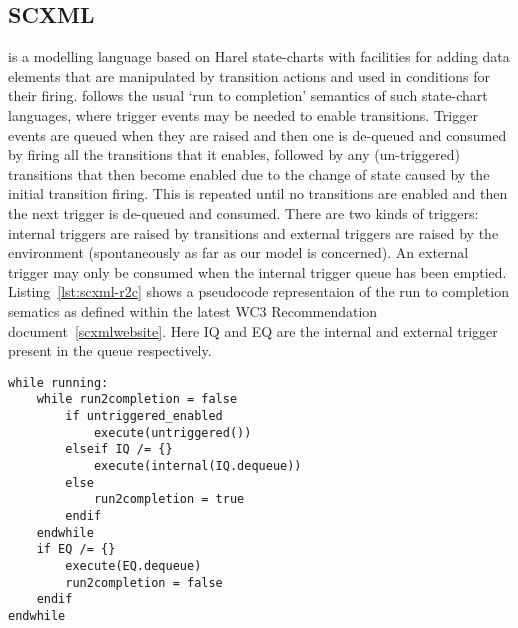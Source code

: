 

\subsection{SCXML}
\label{sec:scxml}

\SCXML is a modelling language based on Harel state-charts with facilities for adding data elements that are manipulated by transition actions and used in conditions for their firing. \SCXML follows the usual `run to completion' semantics of such state-chart languages, where trigger events may be needed to enable transitions. Trigger events are queued when they are raised and then one is de-queued and consumed by firing all the transitions that it enables, followed by any (un-triggered) transitions that then become enabled due to the change of state caused by the initial transition firing. This is repeated until no transitions are enabled and then the next trigger is de-queued and consumed. There are two kinds of triggers: internal triggers are raised by transitions and external triggers are raised by the environment (spontaneously as far as our model is concerned). An external trigger may only be consumed when the internal trigger queue has been emptied. Listing~\ref{lst:scxml-r2c} shows a pseudocode representaion of the run to completion sematics as defined within the latest WC3 Recommendation document~\ref{scxmlwebsite}. Here IQ and EQ are the internal and external trigger present in the queue respectively. 

\begin{lstlisting}[caption=Pseudocode for 'run to completion',label={lst:scxml-r2c}]
while running:
	while run2completion = false
		if untriggered_enabled
			execute(untriggered())
		elseif IQ /= {}
			execute(internal(IQ.dequeue)) 
		else
			run2completion = true
		endif
	endwhile
	if EQ /= {}
		execute(EQ.dequeue) 
		run2completion = false
	endif
endwhile 
\end{lstlisting}


